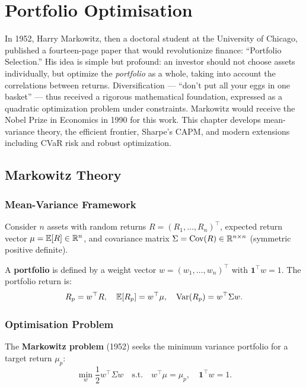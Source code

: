 \chapter{Portfolio Optimisation}
\label{ch:portfolio}

In 1952, Harry Markowitz, then a doctoral student at the University of Chicago, published a fourteen-page paper that would revolutionize finance: ``Portfolio Selection.'' His idea is simple but profound: an investor should not choose assets individually, but optimize the \emph{portfolio} as a whole, taking into account the correlations between returns. Diversification --- ``don't put all your eggs in one basket'' --- thus received a rigorous mathematical foundation, expressed as a quadratic optimization problem under constraints. Markowitz would receive the Nobel Prize in Economics in 1990 for this work. This chapter develops mean-variance theory, the efficient frontier, Sharpe's CAPM, and modern extensions including CVaR risk and robust optimization.

\section{Markowitz Theory}

\subsection{Mean-Variance Framework}

\begin{definition}[Portfolio]
Consider $n$ assets with random returns $R = (R_1, \ldots, R_n)^\top$,
expected return vector $\mu = \mathbb{E}[R] \in \mathbb{R}^n$, and covariance matrix
$\Sigma = \mathrm{Cov}(R) \in \mathbb{R}^{n \times n}$ (symmetric positive definite).

A \textbf{portfolio} is defined by a weight vector
$w = (w_1, \ldots, w_n)^\top$ with $\mathbf{1}^\top w = 1$. The portfolio
return is:
\[
    R_p = w^\top R, \quad \mathbb{E}[R_p] = w^\top\mu, \quad
    \mathrm{Var}(R_p) = w^\top\Sigma w.
\]
\end{definition}

\subsection{Optimisation Problem}

\begin{definition}
The \textbf{Markowitz problem} (1952) seeks the minimum variance portfolio
for a target return $\mu_p$:
\[
    \min_w \frac{1}{2}w^\top\Sigma w \quad \text{s.t.} \quad
    w^\top\mu = \mu_p, \quad \mathbf{1}^\top w = 1.
\]
\end{definition}

